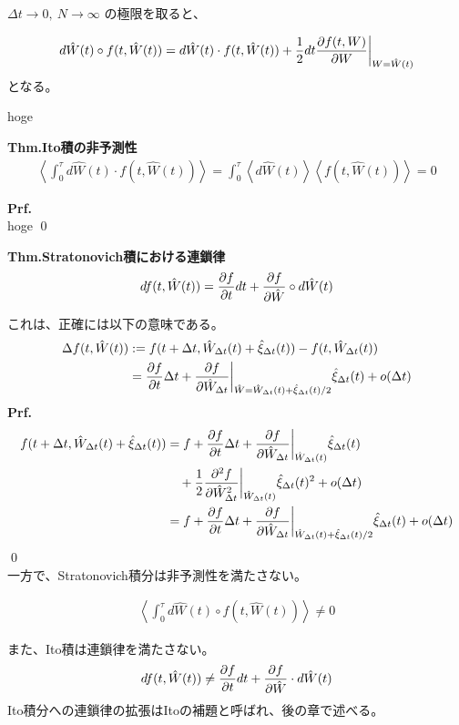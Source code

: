 \documentclass[a4paper,11pt]{jsarticle}
\numberwithin{equation}{section}
\begin{document}
\(\Delta t \to 0,\ N \to \infty\) の極限を取ると、

\begin{align}
d\hat{W}(t) \circ f(t, \hat{W}(t)) = d\hat{W}(t) \cdot f(t, \hat{W}(t)) + \frac{1}{2} dt \pdv{f(t, W)}{W} \biggr|_{W = \hat{W}(t)}
\end{align}
となる。

hoge

\begin{itembox}[l]{\textbf{Thm.Ito積の非予測性}}
  \begin{align}
\left\langle \int_0^\tau d\hat{W}(t) \cdot f(t, \hat{W}(t)) \right\rangle
= \int_0^\tau \left\langle d\hat{W}(t) \right\rangle \left\langle f(t, \hat{W}(t)) \right\rangle = 0
\end{align}
\end{itembox}
\textbf{Prf.}\\
hoge \qed\\

\begin{itembox}[l]{\textbf{Thm.Stratonovich積における連鎖律}}
  \begin{align}
df(t, \hat{W}(t)) = \pdv{f}{t} dt + \pdv{f}{\hat{W}} \circ d\hat{W}(t)
\end{align}
\end{itembox}
これは、正確には以下の意味である。
\begin{align}
\Delta f(t, \hat{W}(t)) &:= f(t + \Delta t, \hat{W}_{\Delta t}(t) + \hat{\xi}_{\Delta t}(t)) - f(t, \hat{W}_{\Delta t}(t)) \notag \\
&= \pdv{f}{t} \Delta t + \pdv{f}{\hat{W}_{\Delta t}} \biggr|_{\hat{W} = \hat{W}_{\Delta t}(t) + \hat{\xi}_{\Delta t}(t)/2} \hat{\xi}_{\Delta t}(t) + o(\Delta t)
\end{align}
\textbf{Prf.}\\
\begin{align}
f(t + \Delta t, \hat{W}_{\Delta t}(t) + \hat{\xi}_{\Delta t}(t)) &=
f + \pdv{f}{t} \Delta t + \pdv{f}{\hat{W}_{\Delta t}} \biggr|_{\hat{W}_{\Delta t}(t)} \hat{\xi}_{\Delta t}(t) \notag \\
&\quad + \frac{1}{2} \pdv[2]{f}{\hat{W}_{\Delta t}} \biggr|_{\hat{W}_{\Delta t}(t)} \hat{\xi}_{\Delta t}(t)^2 + o(\Delta t) \\
&= f + \pdv{f}{t} \Delta t + \pdv{f}{\hat{W}_{\Delta t}} \biggr|_{\hat{W}_{\Delta t}(t) + \hat{\xi}_{\Delta t}(t)/2} \hat{\xi}_{\Delta t}(t) + o(\Delta t)
\end{align}
\qed\\

一方で、Stratonovich積分は非予測性を満たさない。

\begin{align}
\left\langle \int_0^\tau d\hat{W}(t) \circ f(t, \hat{W}(t)) \right\rangle \ne 0
\end{align}

また、Ito積は連鎖律を満たさない。
\begin{align}
df(t, \hat{W}(t)) \ne \pdv{f}{t} dt + \pdv{f}{\hat{W}} \cdot d\hat{W}(t)
\end{align}
Ito積分への連鎖律の拡張はItoの補題と呼ばれ、後の章で述べる。
\end{document}
